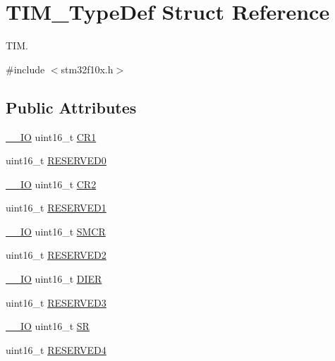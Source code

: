 \hypertarget{struct_t_i_m___type_def}{}\section{T\+I\+M\+\_\+\+Type\+Def Struct Reference}
\label{struct_t_i_m___type_def}


T\+IM.  




{\ttfamily \#include $<$stm32f10x.\+h$>$}

\subsection*{Public Attributes}
\begin{DoxyCompactItemize}
\item 
\hyperlink{core__sc300_8h_aec43007d9998a0a0e01faede4133d6be}{\+\_\+\+\_\+\+IO} uint16\+\_\+t \hyperlink{struct_t_i_m___type_def_a410988826004fdd21d55071215144ba9}{C\+R1}
\item 
uint16\+\_\+t \hyperlink{struct_t_i_m___type_def_a88caad1e82960cc6df99d935ece26c1b}{R\+E\+S\+E\+R\+V\+E\+D0}
\item 
\hyperlink{core__sc300_8h_aec43007d9998a0a0e01faede4133d6be}{\+\_\+\+\_\+\+IO} uint16\+\_\+t \hyperlink{struct_t_i_m___type_def_a954eb69fd4e2e6b43ba6c80986f691d8}{C\+R2}
\item 
uint16\+\_\+t \hyperlink{struct_t_i_m___type_def_a59c46ac3a56c6966a7f8f379a2fd1e3e}{R\+E\+S\+E\+R\+V\+E\+D1}
\item 
\hyperlink{core__sc300_8h_aec43007d9998a0a0e01faede4133d6be}{\+\_\+\+\_\+\+IO} uint16\+\_\+t \hyperlink{struct_t_i_m___type_def_a476012f1b4567ffc21ded0b5fd50985e}{S\+M\+CR}
\item 
uint16\+\_\+t \hyperlink{struct_t_i_m___type_def_af62f86f55f2a387518f3de10d916eb7c}{R\+E\+S\+E\+R\+V\+E\+D2}
\item 
\hyperlink{core__sc300_8h_aec43007d9998a0a0e01faede4133d6be}{\+\_\+\+\_\+\+IO} uint16\+\_\+t \hyperlink{struct_t_i_m___type_def_a25b145e57a694bb384eee08fcd107c3a}{D\+I\+ER}
\item 
uint16\+\_\+t \hyperlink{struct_t_i_m___type_def_a8f952613a22049f3ea2b50b7e0d10472}{R\+E\+S\+E\+R\+V\+E\+D3}
\item 
\hyperlink{core__sc300_8h_aec43007d9998a0a0e01faede4133d6be}{\+\_\+\+\_\+\+IO} uint16\+\_\+t \hyperlink{struct_t_i_m___type_def_af686e22c1792dc59dfeffe451d47cf13}{SR}
\item 
uint16\+\_\+t \hyperlink{struct_t_i_m___type_def_a36afe894c9b0878347d0c038c80e4c22}{R\+E\+S\+E\+R\+V\+E\+D4}

\end{DoxyCompactItemize}
